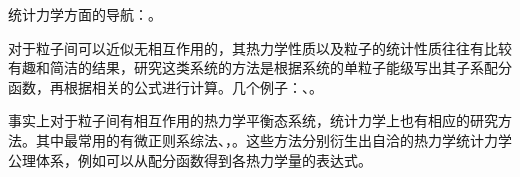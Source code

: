 统计力学方面的导航：。

对于粒子间可以近似无相互作用的，其热力学性质以及粒子的统计性质往往有比较有趣和简洁的结果，研究这类系统的方法是根据系统的单粒子能级写出其子系配分函数，再根据相关的公式进行计算。几个例子：、。

事实上对于粒子间有相互作用的热力学平衡态系统，统计力学上也有相应的研究方法。其中最常用的有微正则系综法、，。这些方法分别衍生出自洽的热力学统计力学公理体系，例如可以从配分函数得到各热力学量的表达式。
